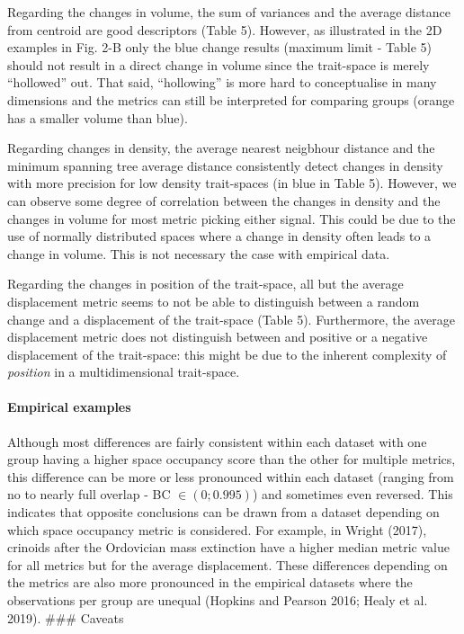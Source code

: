 \documentclass[]{article}
\let\oldparagraph\paragraph
\renewcommand{\paragraph}[1]{\oldparagraph{#1}\mbox{}}
\begin{document}
Regarding the changes in volume, the sum of variances and the average
distance from centroid are good descriptors (Table 5). However, as
illustrated in the 2D examples in Fig. 2-B only the blue change results
(maximum limit - Table 5) should not result in a direct change in volume
since the trait-space is merely ``hollowed'' out. That said,
``hollowing'' is more hard to conceptualise in many dimensions and the
metrics can still be interpreted for comparing groups (orange has a
smaller volume than blue).

Regarding changes in density, the average nearest neigbhour distance and
the minimum spanning tree average distance consistently detect changes
in density with more precision for low density trait-spaces (in blue in
Table 5). However, we can observe some degree of correlation between the
changes in density and the changes in volume for most metric picking
either signal. This could be due to the use of normally distributed
spaces where a change in density often leads to a change in volume. This
is not necessary the case with empirical data.

Regarding the changes in position of the trait-space, all but the
average displacement metric seems to not be able to distinguish between
a random change and a displacement of the trait-space (Table 5).
Furthermore, the average displacement metric does not distinguish
between and positive or a negative displacement of the trait-space: this
might be due to the inherent complexity of \emph{position} in a
multidimensional trait-space.

\paragraph{Empirical examples}\label{empirical-examples-1}

Although most differences are fairly consistent within each dataset with
one group having a higher space occupancy score than the other for
multiple metrics, this difference can be more or less pronounced within
each dataset (ranging from no to nearly full overlap - BC
\(\in(0;0.995)\)) and sometimes even reversed. This indicates that
opposite conclusions can be drawn from a dataset depending on which
space occupancy metric is considered. For example, in Wright (2017),
crinoids after the Ordovician mass extinction have a higher median
metric value for all metrics but for the average displacement. These
differences depending on the metrics are also more pronounced in the
empirical datasets where the observations per group are unequal (Hopkins
and Pearson 2016; Healy et al. 2019). \#\#\# Caveats
\end{document}
